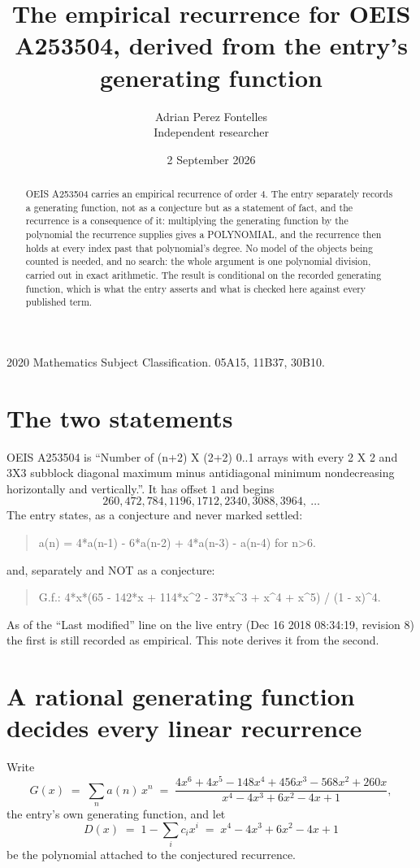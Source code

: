 \documentclass[11pt,a4paper]{article}
\title{The empirical recurrence for OEIS A253504, derived from the entry's generating function}
\author{Adrian Perez Fontelles\\ \small Independent researcher}
\date{2 September 2026}
\theoremstyle{plain}
\theoremstyle{definition}
\begin{document}
\maketitle

\begin{abstract}
OEIS A253504 carries an empirical recurrence of order $4$. The entry separately records a
generating function, not as a conjecture but as a statement of fact, and the recurrence is a
consequence of it: multiplying the generating function by the polynomial the recurrence
supplies gives a POLYNOMIAL, and the recurrence then holds at every index past that
polynomial's degree. No model of the objects being counted is needed, and no search: the
whole argument is one polynomial division, carried out in exact arithmetic. The result is
conditional on the recorded generating function, which is what the entry asserts and what is
checked here against every published term.
\end{abstract}

\noindent\small 2020 Mathematics Subject Classification. 05A15, 11B37, 30B10.\normalsize

\section{The two statements}

OEIS A253504 is ``Number of (n+2) X (2+2) 0..1 arrays with every 2 X 2 and 3X3 subblock diagonal maximum minus antidiagonal minimum nondecreasing horizontally and vertically.''. It has offset $1$ and begins
\[
260, 472, 784, 1196, 1712, 2340, 3088, 3964,\ \dots
\]
The entry states, as a conjecture and never marked settled:
\begin{quote}
a(n) = 4*a(n-1) - 6*a(n-2) + 4*a(n-3) - a(n-4) for n>6.
\end{quote}
and, separately and NOT as a conjecture:
\begin{quote}
G.f.: 4*x*(65 - 142*x + 114*x\^{}2 - 37*x\^{}3 + x\^{}4 + x\^{}5) / (1 - x)\^{}4.
\end{quote}
As of the ``Last modified'' line on the live entry (Dec 16 2018 08:34:19, revision 8) the first is still
recorded as empirical. This note derives it from the second.

\section{A rational generating function decides every linear recurrence}

Write
\[
G(x)\;=\;\sum_{n}a(n)\,x^{n}\;=\;\frac{4 x^{6} + 4 x^{5} - 148 x^{4} + 456 x^{3} - 568 x^{2} + 260 x}{x^{4} - 4 x^{3} + 6 x^{2} - 4 x + 1},
\]
the entry's own generating function, and let
\[
D(x)\;=\;1-\sum_i c_i x^{i}\;=\;x^{4} - 4 x^{3} + 6 x^{2} - 4 x + 1
\]
be the polynomial attached to the conjectured recurrence.
\end{document}
